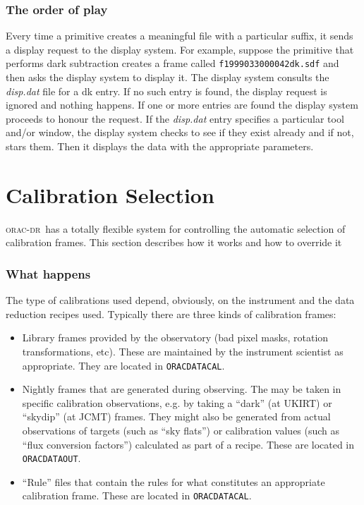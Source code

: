 \documentclass[twoside,11pt]{article}
\newcommand{\xlabel}[1]{}
\renewcommand{\_}{\texttt{\symbol{95}}}
\newcommand{\oracdr}{\textsc{orac-dr}}
\begin{document}
\subsubsection*{The order of play\label{The_ORAC-DR_Display_System_The_order_of_play}}

Every time a primitive creates a meaningful file with a particular
suffix, it sends a display request to the display system. For example, 
suppose the primitive that performs dark subtraction creates a frame
called \texttt{f19990330\_00042\_dk.sdf} and then asks the display system to
display it. The display system consults the \emph{disp.dat} file for a dk
entry. If no such entry is found, the display request is ignored and
nothing happens. If one or more entries are found the display system
proceeds to honour the request. If the \emph{disp.dat} entry specifies a
particular tool and/or window, the display system checks to see if
they exist already and if not, stars them. Then it displays the data
with the appropriate parameters.


\section{\xlabel{calibration_selection}Calibration Selection\label{Calibration_Selection}}

\oracdr\ has a totally flexible system for controlling the automatic
selection of calibration frames.  This section describes how it works and
how to override it

\subsubsection*{What happens\label{The_ORAC-DR_Calibration_Selection_What_happens}}

The type of calibrations used depend, obviously, on the instrument and
the data reduction recipes used. Typically there are three kinds of
calibration frames:

\begin{itemize}
\item 

Library frames provided by the observatory (bad pixel masks, rotation
transformations, etc). These are maintained by the instrument
scientist as appropriate. They are located in \texttt{ORAC\_DATA\_CAL}.

\item 

Nightly frames that are generated during observing. The may be taken
in specific calibration observations, e.g. by taking a ``dark'' (at UKIRT)
or ``skydip'' (at JCMT) frames. They might also be generated from
actual observations of targets (such as ``sky flats'') or
calibration values (such as ``flux conversion factors'') calculated
as part of a recipe. These are located in \texttt{ORAC\_DATA\_OUT}.

\item 

``Rule'' files that contain the rules for what constitutes an
appropriate calibration frame. These are located in \texttt{ORAC\_DATA\_CAL}.

\end{itemize}
\end{document}
